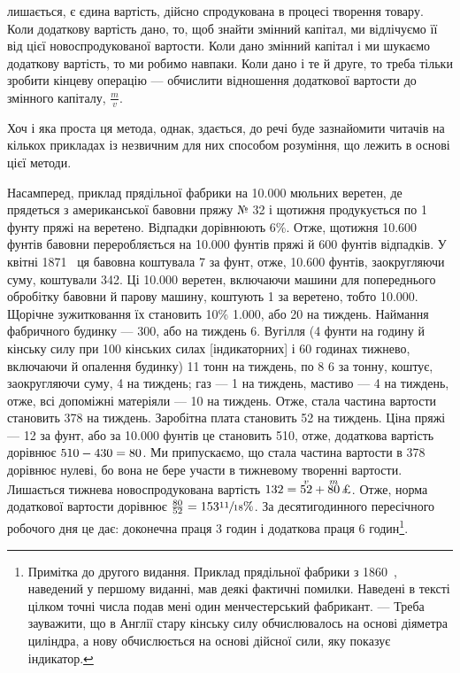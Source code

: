 \parcont{}  %
лишається, є єдина вартість, дійсно спродукована в процесі творення товару. Коли додаткову вартість
дано, то, щоб знайти змінний капітал, ми відлічуємо її від цієї новоспродукованої вартости.
Коли дано змінний капітал і ми шукаємо додаткову вартість, то ми робимо навпаки. Коли дано і те й
друге, то треба тільки зробити кінцеву операцію — обчислити відношення додаткової вартости до
змінного капіталу, $\frac{m}{v}$.

Хоч і яка проста ця метода, однак, здається, до речі буде зазнайомити читачів на кількох прикладах
із незвичним для них
способом розуміння, що лежить в основі цієї методи.

Насамперед, приклад прядільної фабрики на \num{10.000} мюльних веретен, де прядеться з американської
бавовни пряжу № 32 і
щотижня продукується по 1 фунту пряжі на веретено. Відпадки дорівнюють 6\%. Отже, щотижня \num{10.600}
фунтів бавовни переробляється на \num{10.000} фунтів пряжі й 600 фунтів відпадків. У квітні 1871~ ця
бавовна коштувала 7 за фунт, отже, \num{10.600} фунтів, заокругляючи суму, коштували 342. Ці \num{10.000}
веретен, включаючи машини для попереднього обробітку бавовни й парову машину, коштують 1 за веретено, тобто \num{10.000}. Щорічне зужитковання їх становить
10\% \deq{} \num{1.000}, або 20 на тиждень. Наймання фабричного будинку —
300, або на тиждень 6. Вугілля (4 фунти на годину
й кінську силу при 100 кінських силах [індикаторних] і 60 годинах тижнево, включаючи й опалення
будинку) 11 тонн
на тиждень, по 8 6 за тонну, коштує, заокругляючи суму, 4 на
тиждень; газ — 1 на тиждень, мастиво — 4 на тиждень, отже, всі
допоміжні матеріяли — 10 на тиждень. Отже, стала частина вартости становить 378
на тиждень. Заробітна плата становить 52 на тиждень. Ціна пряжі — 12 за
фунт, або за \num{10.000} фунтів
це становить 510, отже, додаткова вартість дорівнює $510 - 430 \deq{} 80$. Ми припускаємо, що стала частина вартости в 378 дорівнює нулеві, бо
вона не бере участи в тижневому творенні вартости.
Лишається тижнева новоспродукована вартість $132 \deq{} \oversetn{v}{52} \dplus{} \oversetn{m}{80}\text{\pound{ фунтів стерлінґів}}$. Отже, норма
додаткової вартости дорівнює
$\frac{80}{52} \deq{} 153\sfrac{11}{18}\%$. За десятигодинного пересічного робочого дня це дає: доконечна праця \deq{} 3
годин і додаткова праця \deq{} 6 годин\footnote{
Примітка до другого видання. Приклад прядільної фабрики з 1860~, наведений у першому виданні,
мав деякі фактичні помилки. Наведені в тексті цілком точні числа подав мені один менчестерський
фабрикант. — Треба зауважити, що в Англії стару кінську силу обчислювалось
на основі діяметра циліндра, а нову обчислюється на основі дійсної сили, яку показує індикатор.
}.

